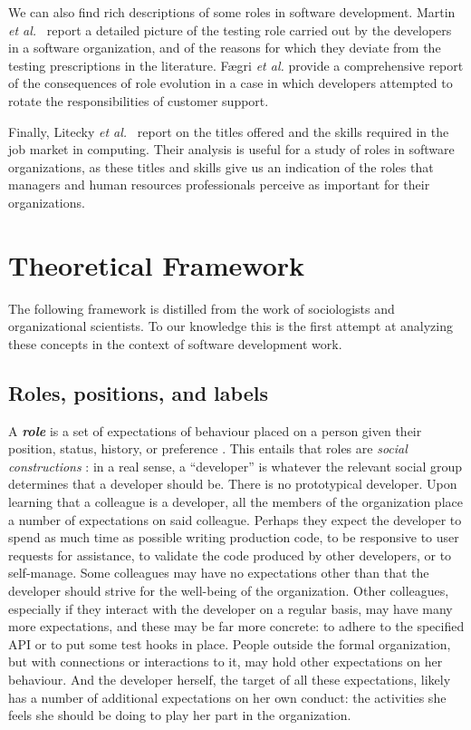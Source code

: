 \documentclass[10pt, conference, compsocconf]{IEEEtran}
\begin{document}
We can also find rich descriptions of some roles in software development. Martin \emph{et al.}\ \cite{Martin2007} report a detailed picture of the testing role carried out by the developers in a software organization, and of the reasons for which they deviate from the testing prescriptions in the literature. F{\ae}gri \emph{et al.} \cite{Faegri2010} provide a comprehensive report of the consequences of role evolution in a case in which developers attempted to rotate the responsibilities of customer support.

Finally, Litecky \emph{et al.}\ \cite{Litecky2010} report on the titles offered and the skills required in the job market in computing. Their analysis is useful for a study of roles in software organizations, as these titles and skills give us an indication of the roles that managers and human resources professionals perceive as important for their organizations.




\section{Theoretical Framework}

The following framework is distilled from the work of sociologists and organizational scientists. To our knowledge this is the first attempt at analyzing these concepts in the context of software development work.


\subsection{Roles, positions, and labels}

A \textbf{\emph{role}} is a set of expectations of behaviour placed on a person given their position, status, history, or preference \cite{Turner1956,Gordon1976,Rizzo1970}. This entails that roles are \emph{social constructions} \cite{Berger1967}: in a real sense, a ``developer'' is whatever the relevant social group determines that a developer should be. There is no prototypical developer. Upon learning that a colleague is a developer, all the members of the organization place a number of expectations on said colleague. Perhaps they expect the developer to spend as much time as possible writing production code, to be responsive to user requests for assistance, to validate the code produced by other developers, or to self-manage. Some colleagues may have no expectations other than that the developer should strive for the well-being of the organization. Other colleagues, especially if they interact with the developer on a regular basis, may have many more expectations, and these may be far more concrete: to adhere to the specified API or to put some test hooks in place. People outside the formal organization, but with connections or interactions to it, may hold other expectations on her behaviour. And the developer herself, the target of all these expectations, likely has a number of additional expectations on her own conduct: the activities she feels she should be doing to play her part in the organization.
\end{document}
